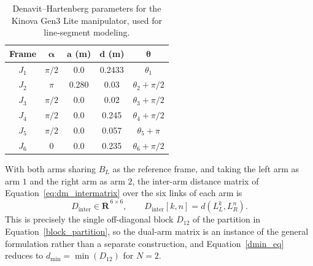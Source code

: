 \begin{table}[htbp]
\centering
\caption{Denavit--Hartenberg parameters for the Kinova Gen3 Lite manipulator, used for line-segment
modeling.}
\label{tab:dm_dh}
\begin{tabular}{ccccc}
\toprule
\textbf{Frame} & $\boldsymbol{\alpha}$ & $\mathbf{a}$ (m) & $\mathbf{d}$ (m) & $\boldsymbol{\theta}$ \\
\midrule
$J_1$ & $\pi/2$ & 0.0   & 0.2433 & $\theta_1$ \\
$J_2$ & $\pi$   & 0.280 & 0.03   & $\theta_2 + \pi/2$ \\
$J_3$ & $\pi/2$ & 0.0   & 0.02   & $\theta_3 + \pi/2$ \\
$J_4$ & $\pi/2$ & 0.0   & 0.245  & $\theta_4 + \pi/2$ \\
$J_5$ & $\pi/2$ & 0.0   & 0.057  & $\theta_5 + \pi$ \\
$J_6$ & 0       & 0.0   & 0.235  & $\theta_6 + \pi/2$ \\
\bottomrule
\end{tabular}
\end{table}

With both arms sharing $B_L$ as the reference frame, and taking the left arm as arm $1$ and the right
arm as arm $2$, the inter-arm distance matrix of Equation~\eqref{eq:dm_intermatrix} over the six links
of each arm is
\begin{equation}
D_{\text{inter}} \in \overline{\mathbf{R}}^{\,6 \times 6}, \qquad D_{\text{inter}}[k,n] = d(L_L^k, L_R^n).
\label{eq:dm_interarm}
\end{equation}
This is precisely the single off-diagonal block $D_{12}$ of the partition in
Equation~\eqref{block_partition}, so the dual-arm matrix is an instance of the general formulation
rather than a separate construction, and Equation~\eqref{dmin_eq} reduces to
$d_{\min} = \min(D_{12})$ for $N = 2$.

